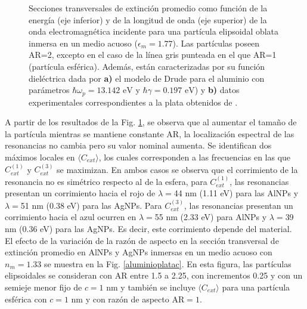 \begin{figure}[h!]
	\quad%
	\caption{Secciones transversales de extinción promedio como función de la energía (eje inferior) y de la longitud de onda (eje superior) de la onda electromagnética incidente para una partícula elipsoidal oblata inmersa en un medio acuoso ($\epsilon_m=1.77$). Las partículas poseen AR=2, excepto en el caso de la línea gris punteada en el que AR=1 (partícula esférica). Además, están caracterizadas por su función dieléctrica dada por  \textbf{a)} el modelo de Drude para el aluminio con parámetros $\hbar\omega_p=13.142\text{ eV}$ y $\hbar\gamma=0.197\text{ eV}$) y \textbf{b)} datos experimentales correspondientes a la plata obtenidos de \cite{Plata}. }\label{aluminioplataAR}
\end{figure}
A partir de los resultados de la Fig. \ref{aluminioplataAR}, se observa que al aumentar el tamaño de la partícula mientras se mantiene constante AR, la localización espectral de las resonancias no cambia pero su valor nominal aumenta. Se identifican dos máximos locales en $\langle C_{ext}\rangle$,  los cuales corresponden a las frecuencias en las que $C_{ext}^{(1)}$ y $C_{ext}^{(3)}$ se maximizan. En ambos casos se observa que el corrimiento  de la resonancia no es simétrico respecto al de la esfera, para $C_{ext}^{(1)}$, las resonancias presentan un corrimiento hacia el rojo de $\lambda=$44 nm (1.11 eV) para las AlNPs y $\lambda=$51 nm (0.38 eV) para las AgNPs. Para $C_{ext}^{(3)}$, las resonancias presentan un corrimiento hacia el azul ocurren en $\lambda=$55 nm (2.33 eV) para AlNPs y $\lambda=$39 nm (0.36 eV) para las AgNPs. Es decir, este corrimiento depende del material.\\

El efecto de la variación de la razón de aspecto en la sección transversal de extinción promedio en AlNPs y AgNPs inmersas en un medio acuoso con $n_m=1.33$ se muestra en la Fig. \ref{aluminioplatac}. En esta figura, las partículas elipsoidales se consideran con AR entre 1.5 a 2.25, con incrementos 0.25 y con un semieje menor fijo de $c=1\text{ nm}$ y también se incluye $\langle C_{ext}\rangle$ para una partícula esférica con  $c=1\text{ nm}$ y con razón de aspecto AR$=1$.



